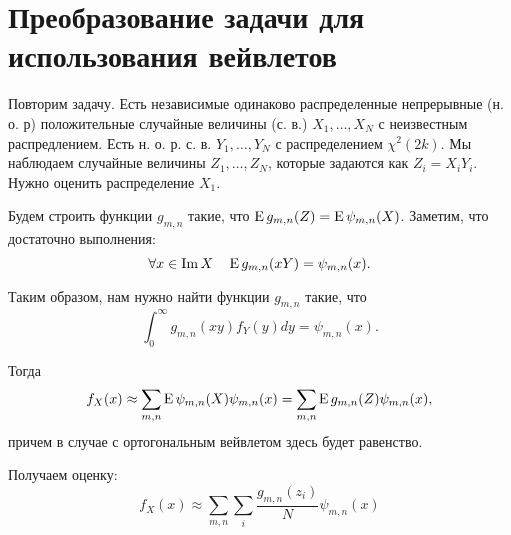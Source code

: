 \documentclass[../paper.tex]{subfiles}
\begin{document}
\section{Преобразование задачи для использования вейвлетов}
Повторим задачу.
Есть независимые одинаково распределенные непрерывные (н. о. р) положительные случайные величины (с. в.) $X_1, \dots, X_N$ с неизвестным распредлением.
Есть н. о. р. с. в. $Y_1, \dots, Y_N$ с распределением $\chi^2(2k)$.
Мы наблюдаем случайные величины $Z_1, \dots, Z_N$, которые задаются как $Z_i = X_i Y_i$.
Нужно оценить распределение $X_1$.

Будем строить функции $g_{m,n}$ такие, что $\operatorname{E} g_{m,n}(Z) = \operatorname{E} \psi_{m,n}(X)$. Заметим, что достаточно выполнения:
\[
    \forall x \in \operatorname{Im} X \quad \operatorname{E} g_{m,n} (xY) = \psi_{m,n}(x) 
.\]

Таким образом, нам нужно найти функции $g_{m,n}$ такие, что
\[
	\int_0^\infty g_{m,n}(xy) f_Y(y) dy = \psi_{m,n}(x)
.\]

Тогда
\[
	f_X(x) 
	\approx \sum_{m,n} \operatorname{E} \psi_{m,n}(X)\psi_{m,n}(x)
	= \sum_{m,n} \operatorname{E} g_{m,n}(Z) \psi_{m,n}(x)
,\] причем в случае с ортогональным вейвлетом здесь будет равенство.

Получаем оценку:
\[
	f_X(x) 
	\approx \sum_{m,n} \sum_i \frac{g_{m,n}(z_i)}{N} \psi_{m,n}(x)
\]
\end{document}
